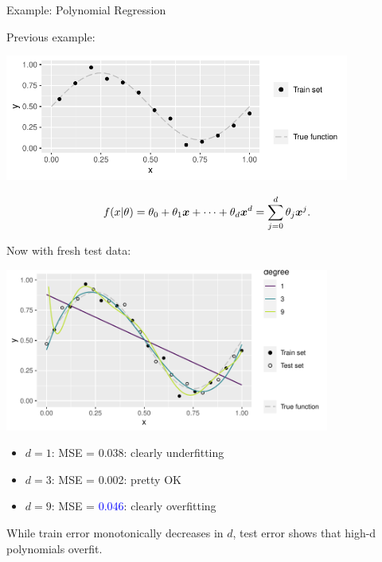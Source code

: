 \begin{vbframe}{Example: Polynomial Regression}

Previous example:

\vfill

\begin{center}
  \includegraphics[width=0.85\textwidth]{figure/eval_train_1}
\end{center}

\[ f(x | \theta) = \theta_0 + \theta_1 \bm{x} + \cdots + \theta_d \bm{x}^d = \sum_{j = 0}^{d}
\theta_j \bm{x}^j\text. \]

\framebreak

Now with fresh test data:

\includegraphics[width=0.8\textwidth]{figure/eval_test_2} 

\begin{itemize}
  \footnotesize
  \item $d = 1$: MSE = 0.038: clearly underfitting
  \item $d = 3$: MSE = 0.002: pretty OK
  \item $d = 9$: MSE = \textcolor{blue}{0.046}: clearly overfitting
\end{itemize}

\vfill

While train error monotonically decreases in $d$, 
test error shows that high-d polynomials overfit.

\end{vbframe}

